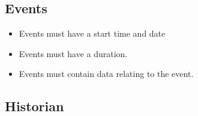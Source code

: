 \subsection{Events}
\begin{itemize}
	\item Events must have a start time and date
	\item Events must have a duration.
	\item Events must contain data relating to the event.
\end{itemize}
\subsection{Historian}
